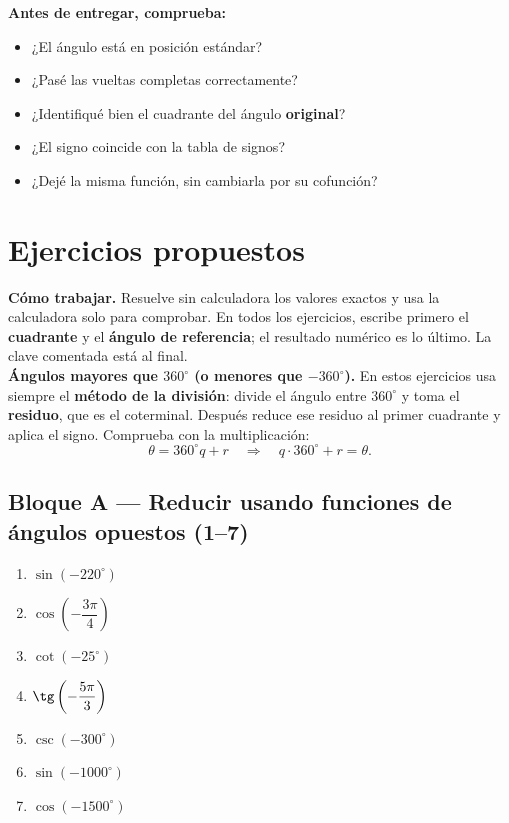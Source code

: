 \documentclass[12pt, letterpaper]{article}
\providecommand{\sen}{\sin}
\begin{document}
\begin{cuadroinfo}[nobreak]
  \small
  \textbf{Antes de entregar, comprueba:}
  \begin{itemize}[leftmargin=1.2em, nosep, topsep=2pt]
    \item ¿El ángulo está en posición estándar?
    \item ¿Pasé las vueltas completas correctamente?
    \item ¿Identifiqué bien el cuadrante del ángulo \textbf{original}?
    \item ¿El signo coincide con la tabla de signos?
    \item ¿Dejé la misma función, sin cambiarla por su cofunción?
  \end{itemize}
\end{cuadroinfo}

\section{Ejercicios propuestos}

\begin{cuadroinfo}
  \small
  \textbf{Cómo trabajar.} Resuelve sin calculadora los valores exactos y usa
  la calculadora solo para comprobar. En todos los ejercicios, escribe
  primero el \textbf{cuadrante} y el \textbf{ángulo de referencia}; el
  resultado numérico es lo último. La clave comentada está al final.
  \\[4pt]
  \textbf{Ángulos mayores que $360^\circ$ (o menores que $-360^\circ$).}
  En estos ejercicios usa siempre el \textbf{método de la división}: divide
  el ángulo entre $360^\circ$ y toma el \textbf{residuo}, que es el
  coterminal. Después reduce ese residuo al primer cuadrante y aplica el
  signo. Comprueba con la multiplicación:
  \[
    \theta=360^\circ q+r \quad\Longrightarrow\quad
    q\cdot360^\circ+r=\theta .
  \]
\end{cuadroinfo}

\subsection*{Bloque A — Reducir usando funciones de ángulos opuestos (1--7)}

\begin{enumerate}[leftmargin=*, label=\textbf{\arabic*.}]
  \item $\sen(-220^\circ)$
  \item $\cos\left(-\dfrac{3\pi}{4}\right)$
  \item $\cot(-25^\circ)$
  \item $\tg\left(-\dfrac{5\pi}{3}\right)$
  \item $\csc(-300^\circ)$
  \item $\sen(-1000^\circ)$
  \item $\cos(-1500^\circ)$
\end{enumerate}
\end{document}
